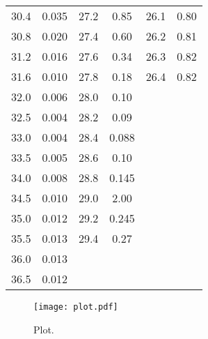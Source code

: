 \begin{longtable}{S[table-format=3.2] S[table-format=3.2] S[table-format=3.2] S[table-format=3.2] S[table-format=3.2] S[table-format=3.2]}
          30.4   &   0.035  &     27.2    &  0.85   & 26.1   &   0.80                                      \\
          30.8   &   0.020  &     27.4    &  0.60   & 26.2   &   0.81                                      \\
          31.2   &   0.016  &     27.6    &  0.34   & 26.3   &   0.82                                      \\
          31.6   &   0.010  &     27.8    &  0.18   & 26.4   &   0.82                                      \\
          32.0   &   0.006  &     28.0    &  0.10                                                          \\
          32.5   &   0.004  &     28.2    &  0.09                                                          \\
          33.0   &   0.004  &     28.4    & 0.088                                                          \\
          33.5   &   0.005  &     28.6    &  0.10                                     \\
          34.0   &   0.008  &     28.8    & 0.145                                     \\
          34.5   &   0.010  &     29.0    &  2.00                                     \\
          35.0   &   0.012  &     29.2    & 0.245                                     \\
          35.5   &   0.013  &     29.4    &  0.27                                     \\
          36.0   &   0.013  &                                     \\
          36.5   &   0.012  &                                     \\
                \bottomrule
\end{longtable}


\begin{figure}
  \centering
  \texttt{[image: plot.pdf]}
  \caption{Plot.}
  \label{fig:plot}
\end{figure}
